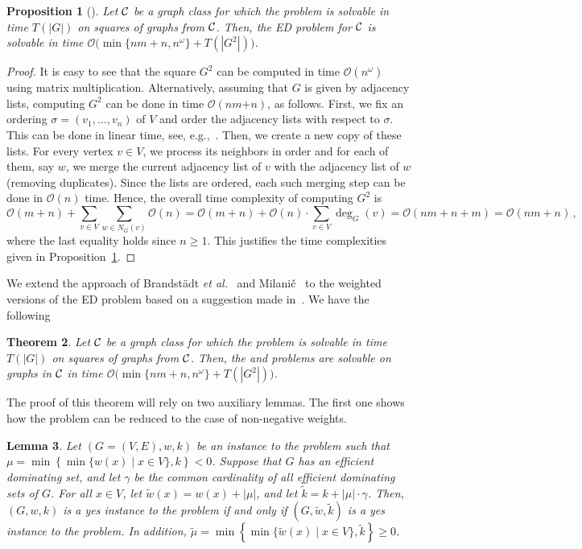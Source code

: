 \documentclass[]{elsarticle}
\newtheorem{theorem}{Theorem}[]
\newtheorem{lemma}[theorem]{Lemma}
\newtheorem{proposition}[theorem]{Proposition}
\def\mwis{{\sc{MWIS }}}
\def\minwed{{\sc{Min-WED }}}
\def\maxwed{{\sc{Max-WED }}}
\begin{document}
\begin{proposition}[\cite{BLR,Milanic}]\label{prop:1}
Let $\cal C$ be a graph class for which the \mwis problem is solvable in time $T(|G|)$ on squares of graphs from $\cal C$.
Then, the ED problem for ${\cal C}$ is solvable in time \hbox{${\mathcal O}\big(\min\{nm+n,n^\omega\}+T(|G^2|))$}.
\end{proposition}

\begin{proof}
It is easy to see that the square $G^2$ can be computed in time ${\mathcal O}(n^{\omega})$ using matrix multiplication. 
Alternatively, assuming that $G$ is given by adjacency lists, computing $G^2$ can be done in time ${\mathcal O}(nm{+n})$, as follows. 
First, we fix an ordering $\sigma = (v_1,\ldots, v_n)$ of $V$ and order the adjacency lists with respect to $\sigma$.
This can be done in linear time, see, e.g.,~\cite[p.~$36$]{Gol04}.
Then, we create a new copy of these lists. For every vertex $v\in V$, we process its neighbors in order and for each of them, say $w$, we merge the current adjacency list of $v$ with the adjacency list of $w$ (removing duplicates).
Since the lists are ordered, each such merging step can be done in ${\mathcal O}(n)$ time.
Hence, the overall time complexity of computing $G^2$ is
\[{\mathcal O}(m+n)+\sum_{v\in V}\sum_{w\in N_G(v)}{\mathcal O}(n) = {\mathcal O}(m+n)+{\mathcal O}(n)\cdot\sum_{v\in V}\deg_G(v) {= {\mathcal O}(nm+n+m)} = {\mathcal O}(nm+n)\,,\]
where the last equality holds since $n\ge 1$.
This justifies the time complexities given in Proposition~\ref{prop:1}.
\end{proof}

We extend the approach of Brandst\"adt {\it et al.}~\cite{BLR} and Milani\v c~\cite{Milanic} to the weighted versions of the ED problem based on a suggestion made in~\cite{Leitert}.
We have the following

\begin{theorem}\label{thm:wed-mwis}
Let $\cal C$ be a graph class for which the \mwis problem is solvable in time $T(|G|)$ on squares of graphs from $\cal C$.
Then, the \minwed and \maxwed problems are solvable on graphs in ${\cal C}$ in time ${\mathcal O}\big(\min\{nm+n,n^\omega\}+T(|G^2|))$.
\end{theorem}


The proof of this theorem will rely on two auxiliary lemmas.
The first one shows how the problem can be reduced to the case of non-negative weights.

\begin{lemma}\label{lem:wed-mwis}
Let $(G = (V,E), w, k)$ be an instance to the \minwed problem such that $\mu = \min\left\{\min\{w(x)\mid x\in V\},k\right\}<0$.
Suppose that $G$ has an efficient dominating set, and let $\gamma$ be the common cardinality of all efficient dominating sets of $G$.
For all $x\in V$, let $\tilde w(x) = w(x)+|\mu|$, and let $\tilde k = k+|\mu|\cdot\gamma$.
Then, $(G, w, k)$  is a yes instance to the \minwed problem if and only if $(G, \tilde w, \tilde k)$ is a yes instance to the \minwed problem.
In addition, $\tilde \mu = \min\left\{\min\{\tilde w(x)\mid x\in V\},\tilde k\right\}\ge 0$.
\end{lemma}
\end{document}
